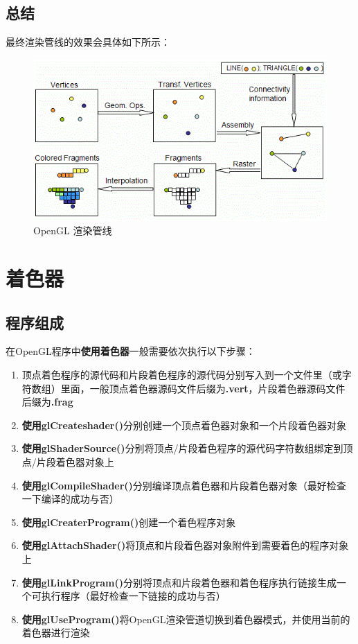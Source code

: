 \documentclass[UTF8,a4paper,12pt]{ctexbook}
\begin{document}
		\subsection{总结}
			最终渲染管线的效果会具体如下所示：
			\begin{figure}[h]
				\centering
				\includegraphics[width=.9\linewidth]{OpenGLPipeline1.png}
				\caption{OpenGL 渲染管线}
			\end{figure}	
			
				
		
	\section{着色器}
		\subsection{程序组成}
			在OpenGL程序中\textbf{使用着色器}一般需要依次执行以下步骤：
			\begin{enumerate}[itemindent = 1em]
				\item 顶点着色程序的源代码和片段着色程序的源代码分别写入到一个文件里（或字符数组）里面，一般顶点着色器源码文件后缀为\textbf{.vert}，片段着色器源码文件后缀为\textbf{.frag}
				\item \textbf{使用glCreateshader()}分别创建一个顶点着色器对象和一个片段着色器对象
				\item \textbf{使用glShaderSource()}分别将顶点/片段着色程序的源代码字符数组绑定到顶点/片段着色器对象上
				\item \textbf{使用glCompileShader()}分别编译顶点着色器和片段着色器对象（最好检查一下编译的成功与否）
				\item \textbf{使用glCreaterProgram()}创建一个着色程序对象
				\item \textbf{使用glAttachShader()}将顶点和片段着色器对象附件到需要着色的程序对象上
				\item \textbf{使用glLinkProgram()}分别将顶点和片段着色器和着色程序执行链接生成一个可执行程序（最好检查一下链接的成功与否）
				\item \textbf{使用glUseProgram()}将OpenGL渲染管道切换到着色器模式，并使用当前的着色器进行渲染
			\end{enumerate}	
		
\end{document}
